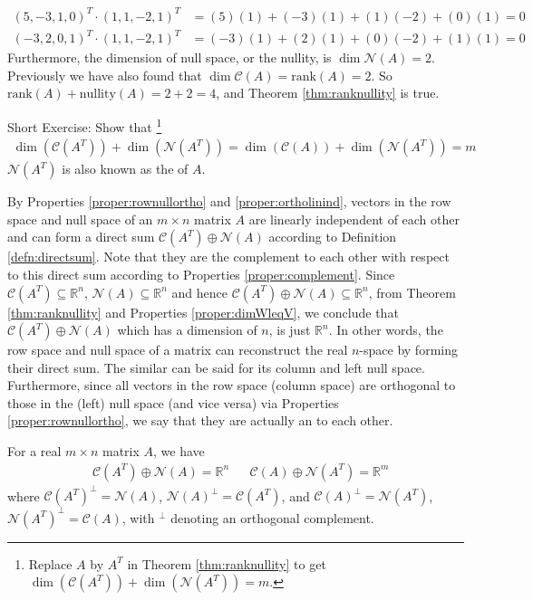 \begin{solution}
\begin{align*}
(5,-3,1,0)^T \cdot (1,1,-2,1)^T &= (5)(1)+(-3)(1)+(1)(-2)+(0)(1) = 0 \\
(-3,2,0,1)^T \cdot (1,1,-2,1)^T &= (-3)(1)+(2)(1)+(0)(-2)+(1)(1) = 0
\end{align*}
Furthermore, the dimension of null space, or the nullity, is $\dim{\mathcal{N}(A)} = 2$. Previously we have also found that $\dim{\mathcal{C}(A)} = \text{rank}(A) = 2$. So $\text{rank}(A) + \text{nullity}(A) = 2+2 = 4$, and Theorem \ref{thm:ranknullity} is true.
\end{solution}
Short Exercise: Show that \footnote{Replace $A$ by $A^T$ in Theorem \ref{thm:ranknullity} to get $\dim(\mathcal{C}(A^T)) + \dim(\mathcal{N}(A^T)) = m$.}
\begin{align*}
\dim(\mathcal{C}(A^T)) + \dim(\mathcal{N}(A^T)) = \dim(\mathcal{C}(A)) + \dim(\mathcal{N}(A^T)) = m   
\end{align*} $\mathcal{N}(A^T)$ is also known as the  of $A$.

By Properties \ref{proper:rownullortho} and \ref{proper:ortholinind}, vectors in the row space and null space of an $m \times n$ matrix $A$ are linearly independent of each other and can form a direct sum $\mathcal{C}(A^T) \oplus \mathcal{N}(A)$ according to Definition \ref{defn:directsum}. Note that they are the complement to each other with respect to this direct sum according to Properties \ref{proper:complement}. Since $\mathcal{C}(A^T) \subseteq \mathbb{R}^n$, $\mathcal{N}(A) \subseteq \mathbb{R}^n$ and hence $\mathcal{C}(A^T) \oplus \mathcal{N}(A) \subseteq \mathbb{R}^n$, from Theorem \ref{thm:ranknullity} and Properties \ref{proper:dimWleqV}, we conclude that $\mathcal{C}(A^T) \oplus \mathcal{N}(A)$ which has a dimension of $n$, is just $\mathbb{R}^n$. In other words, the row space and null space of a matrix can reconstruct the real $n$-space by forming their direct sum. The similar can be said for its column and left null space. Furthermore, since all vectors in the row space (column space) are orthogonal to those in the (left) null space (and vice versa) via Properties \ref{proper:rownullortho}, we say that they are actually an  to each other.

\begin{proper}
\label{proper:funsubsortho}
For a real $m \times n$ matrix $A$, we have
\begin{align*}
& \mathcal{C}(A^T) \oplus \mathcal{N}(A) = \mathbb{R}^n & & \mathcal{C}(A) \oplus \mathcal{N}(A^T) = \mathbb{R}^m
\end{align*}
where $\mathcal{C}(A^T)^\perp = \mathcal{N}(A)$, $\mathcal{N}(A)^\perp = \mathcal{C}(A^T)$, and $\mathcal{C}(A)^\perp = \mathcal{N}(A^T)$, $\mathcal{N}(A^T)^\perp = \mathcal{C}(A)$, with $^\perp$ denoting an orthogonal complement.
\end{proper}

